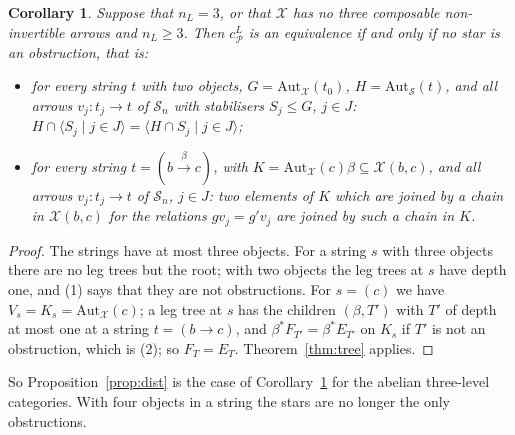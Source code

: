 \documentclass[11pt]{amsart}
\newtheorem{cor}[thm]{Corollary}
\theoremstyle{definition}
\newcommand{\Aut}{\mathrm{Aut}}
\newcommand{\cX}{\mathcal X}
\newcommand{\cP}{\mathcal P}
\newcommand{\cS}{\mathcal S}
\begin{document}
\begin{cor}\label{cor:three}
Suppose that $n_L=3$, or that $\cX$ has no three composable
non-invertible arrows and $n_L\ge3$. Then $c^L_\cP$ is an equivalence
if and only if no star is an obstruction, that is:
\begin{itemize}
\item[(1)] for every string $t$ with two objects, $G=\Aut_{\cX}(t_0)$,
$H=\Aut_{\cS}(t)$, and all arrows $v_j\colon t_j\to t$ of $\cS_n$ with
stabilisers $S_j\le G$, $j\in J$: $H\cap\langle S_j\mid j\in J\rangle
=\langle H\cap S_j\mid j\in J\rangle$;
\item[(2)] for every string $t=(b\xrightarrow{\beta}c)$, with $K=\Aut_{
\cX}(c)\beta\subseteq\cX(b,c)$, and all arrows $v_j\colon t_j\to t$ of
$\cS_n$, $j\in J$: two elements of $K$ which are joined by a chain in
$\cX(b,c)$ for the relations $gv_j=g'v_j$ are joined by such a chain
in $K$.
\end{itemize}
\end{cor}
\begin{proof}
The strings have at most three objects. For a string $s$ with three
objects there are no leg trees but the root; with two objects the
leg trees at $s$ have depth one, and (1) says that they are not
obstructions. For $s=(c)$ we have $V_s=K_s=\Aut_{\cX}(c)$; a leg tree
at $s$ has the children $(\beta,T')$ with $T'$ of depth at most one at
a string $t=(b\to c)$, and $\beta^*F_{T'}=\beta^*E_{T'}$ on $K_s$ if
$T'$ is not an obstruction, which is (2); so $F_T=E_T$.
Theorem~\ref{thm:tree} applies.
\end{proof}

So Proposition~\ref{prop:dist} is the case of
Corollary~\ref{cor:three} for the abelian three-level categories. With
four objects in a string the stars are no longer the only
obstructions.
\end{document}
